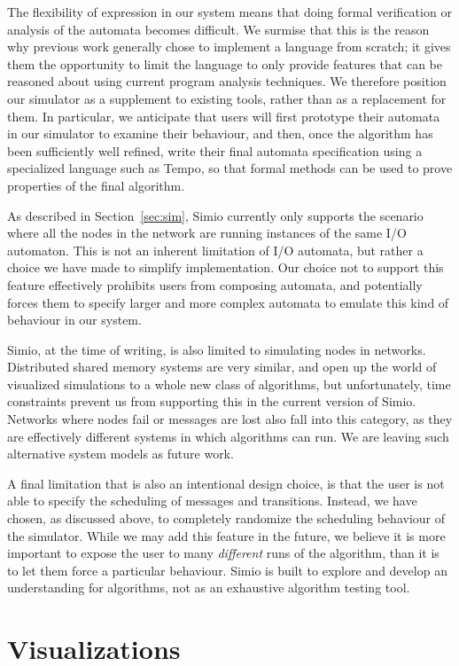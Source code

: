 \documentclass{scrartcl}
\begin{document}
The flexibility of expression in our system means that doing formal verification
or analysis of the automata becomes difficult. We surmise that this is the
reason why previous work generally chose to implement a language from scratch;
it gives them the opportunity to limit the language to only provide features
that can be reasoned about using current program analysis techniques. We
therefore position our simulator as a supplement to existing tools, rather than
as a replacement for them. In particular, we anticipate that users will first
prototype their automata in our simulator to examine their behaviour, and then,
once the algorithm has been sufficiently well refined, write their final
automata specification using a specialized language such as Tempo, so that
formal methods can be used to prove properties of the final algorithm.

As described in Section~\ref{sec:sim}, Simio currently only supports the
scenario where all the nodes in the network are running instances of the same
I/O automaton. This is not an inherent limitation of I/O automata, but rather a
choice we have made to simplify implementation. Our choice not to support this
feature effectively prohibits users from composing automata, and potentially
forces them to specify larger and more complex automata to emulate this kind of
behaviour in our system.

Simio, at the time of writing, is also limited to simulating nodes in networks.
Distributed shared memory systems are very similar, and open up the world of
visualized simulations to a whole new class of algorithms, but unfortunately,
time constraints prevent us from supporting this in the current version of
Simio. Networks where nodes fail or messages are lost also fall into this
category, as they are effectively different systems in which algorithms can
run. We are leaving such alternative system models as future work.

A final limitation that is also an intentional design choice, is that the user
is not able to specify the scheduling of messages and transitions. Instead, we
have chosen, as discussed above, to completely randomize the scheduling
behaviour of the simulator. While we may add this feature in the future, we
believe it is more important to expose the user to many \textit{different} runs
of the algorithm, than it is to let them force a particular behaviour. Simio is
built to explore and develop an understanding for algorithms, not as an
exhaustive algorithm testing tool.

\section{Visualizations}
\end{document}
